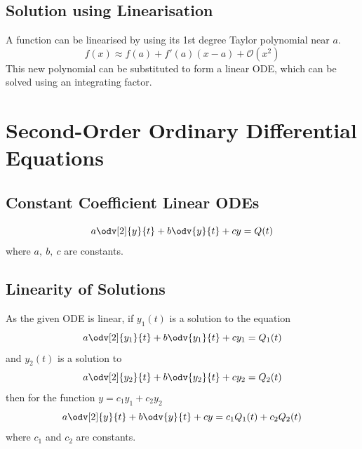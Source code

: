 \documentclass{article}
\begin{document}
\subsection{Solution using Linearisation}
A function can be linearised by using its 1st degree Taylor polynomial near \(a\).
\begin{equation*}
    f(x) \approx f(a) + f'(a)(x-a) + \mathcal{O}(x^2)
\end{equation*}
This new polynomial can be substituted to form a linear ODE, which can be solved using an integrating factor.
\newpage
\section{Second-Order Ordinary Differential Equations}
\subsection{Constant Coefficient Linear ODEs}
\begin{equation*}
    a \odv[2]{y}{t} + b \odv{y}{t} + c y = Q(t)
\end{equation*}
where \(a,\:b,\:c\) are constants.
\subsection{Linearity of Solutions}
\begin{theorem}\label{theorem:superposition}
    As the given ODE is linear, if \(y_1(t)\) is a solution to the equation
    \begin{equation*}
        a \odv[2]{y_1}{t} + b \odv{y_1}{t} + cy_1 = Q_1(t)
    \end{equation*}
    and \(y_2(t)\) is a solution to
    \begin{equation*}
        a \odv[2]{y_2}{t} + b \odv{y_2}{t} + cy_2 = Q_2(t)
    \end{equation*}
    then for the function \(y = c_1y_1+c_2y_2\)
    \begin{equation*}
        a \odv[2]{y}{t} + b \odv{y}{t} + cy = c_1Q_1(t) + c_2Q_2(t)
    \end{equation*}
    where \(c_1\) and \(c_2\) are constants.
\end{theorem}
\end{document}

